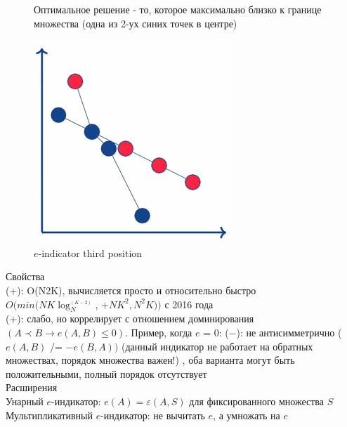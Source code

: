 \begin{figure}[!ht]
Оптимальное решение - то, которое максимально близко к границе множества (одна из 2-ух синих точек в центре)
\begin{center}
    \includegraphics[width=0.3\linewidth]{images/e-indicator2.PNG}
    \caption{$e$-indicator third position}
    \label{fig:mpr}
    
\end{center}

\end{figure}

\newpage

Свойства\\
(+): O(N2K), вычисляется просто и относительно быстро\\
$O(min(NK\log_{N}^_{(K − 2)}$, $+ NK^2, N^2K))$ с 2016 года\\
(+): слабо, но коррелирует с отношением доминирования
$(A ≺ B → e(A,B) ≤ 0)$. Пример, когда $e$ = 0:
(−): не антисимметрично ($e(A,B)$ /= $−e(B,A))$ (данный индикатор не работает на обратных множествах, порядок множества важен!) ,
оба варианта могут быть положительными,
полный порядок отсутствует\\

Расширения\\
Унарный $e$-индикатор: $e(A) = ε(A,S)$ для фиксированного множества $S$\\
Мультипликативный $e$-индикатор: не вычитать $e$, а умножать на $e$
